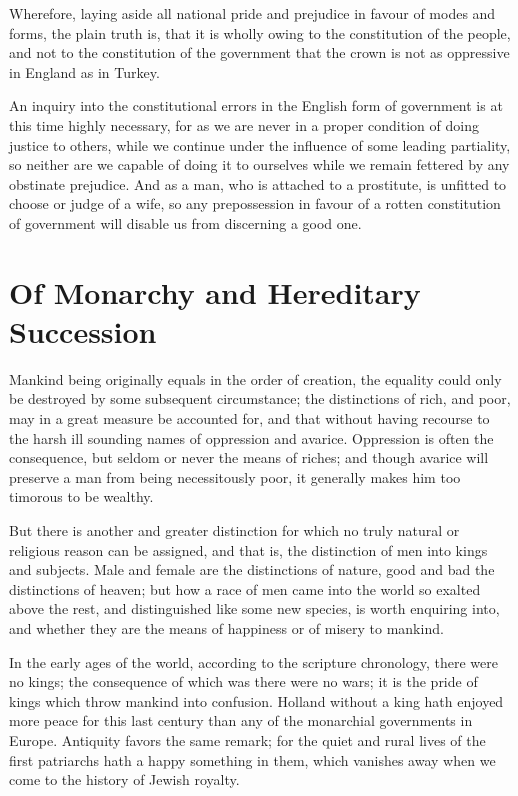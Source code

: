 \documentclass[12pt,oneside]{memoir}
\begin{document}
Wherefore, laying aside all national pride and prejudice in favour of modes and forms, the plain truth is, that it is wholly owing to the constitution of the people, and not to the constitution of the government that the crown is not as oppressive in England as in Turkey.

An inquiry into the constitutional errors in the English form of government is at this time highly necessary, for as we are never in a proper condition of doing justice to others, while we continue under the influence of some leading partiality, so neither are we capable of doing it to ourselves while we remain fettered by any obstinate prejudice. And as a man, who is attached to a prostitute, is unfitted to choose or judge of a wife, so any prepossession in favour of a rotten constitution of government will disable us from discerning a good one.

\section*{Of Monarchy and Hereditary Succession}

Mankind being originally equals in the order of creation, the equality could only be destroyed by some subsequent circumstance; the distinctions of rich, and poor, may in a great measure be accounted for, and that without having recourse to the harsh ill sounding names of oppression and avarice. Oppression is often the consequence, but seldom or never the means of riches; and though avarice will preserve a man from being necessitously poor, it generally makes him too timorous to be wealthy.

But there is another and greater distinction for which no truly natural or religious reason can be assigned, and that is, the distinction of men into kings and subjects. Male and female are the distinctions of nature, good and bad the distinctions of heaven; but how a race of men came into the world so exalted above the rest, and distinguished like some new species, is worth enquiring into, and whether they are the means of happiness or of misery to mankind.

In the early ages of the world, according to the scripture chronology, there were no kings; the consequence of which was there were no wars; it is the pride of kings which throw mankind into confusion. Holland without a king hath enjoyed more peace for this last century than any of the monarchial governments in Europe. Antiquity favors the same remark; for the quiet and rural lives of the first patriarchs hath a happy something in them, which vanishes away when we come to the history of Jewish royalty.
\end{document}
